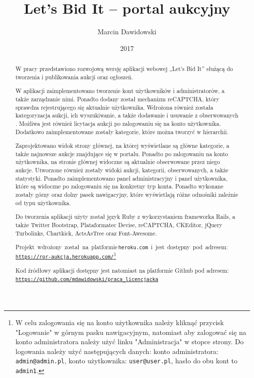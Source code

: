 \documentclass[brudnopis]{xmgr}
\author   {Marcin Dawidowski}
\title    {Let’s Bid It – portal aukcyjny}
\date     {2017}
\begin{document}
\begin{abstract}
  W pracy przedstawiono rozwojową wersję aplikacji webowej „Let's Bid It” służącą do tworzenia i publikowania aukcji oraz ogłoszeń.

  W aplikacji zaimplementowano tworzenie kont użytkowników i administratorów, a także zarządzanie nimi. Ponadto dodany został mechanizm reCAPTCHA, który sprawdza rejestrującego się aktualnie użytkownika.  Wdrożona również została kategoryzacja aukcji, ich wyszukiwanie, a także dodawanie i usuwanie z obserwowanych . Możliwa jest również licytacja aukcji po zalogowaniu się na konto użytkownika. Dodatkowo zaimplementowane zostały kategorie, które można tworzyć w hierarchii.

  Zaprojektowano widok strony głównej, na której wyświetlane są główne kategorie, a także najnowsze aukcje znajdujące się w portalu. Ponadto po zalogowaniu na konto użytkownika, na stronie głównej widoczne są aktualnie obserwowane przez niego aukcje. Utworzone również zostały widoki aukcji, kategorii, obserwowanych, a także statystyki. Ponadto zaimplementowano panel administracyjny i panel użytkownika, które są widoczne po zalogowaniu się na konkretny typ konta. Ponadto wykonane zostały górny oraz dolny pasek nawigacyjny, które wyświetlają różne odnośniki zależnie od typu użytkownika.

  Do tworzenia aplikacji użyty został język Ruby z wykorzystaniem frameworka Rails, a także Twitter Bootstrap, Plataformatec Devise, reCAPTCHA, CKEditor, jQuery Turbolinks, Chartkick, ActsAsTree oraz Font-Awesome.

\mbox{Projekt wdrożony został na platformie\, \\\texttt{heroku.com} i jest dostępny pod adresem:} \\\texttt{\url{https://ror-aukcja.herokuapp.com/}}\footnote{W celu zalogowania się na konto użytkownika należy kliknąć przycisk "Logowanie" w górnym pasku nawigacyjnym, natomiast aby zalogować się na konto administratora należy użyć linku "Administracja" w stopce strony. Do logowania należy użyć następujących danych: konto administratora: \texttt{admin@admin.pl}, konto użytkownika: \texttt{user@user.pl}, hasło do obu kont to \texttt{admin1}.}

Kod źródłowy aplikacji dostępny jest natomiast na platformie Github pod adresem: \\\texttt{\url{https://github.com/mdawidowski/praca_licencjacka}}


\end{abstract}
\end{document}
